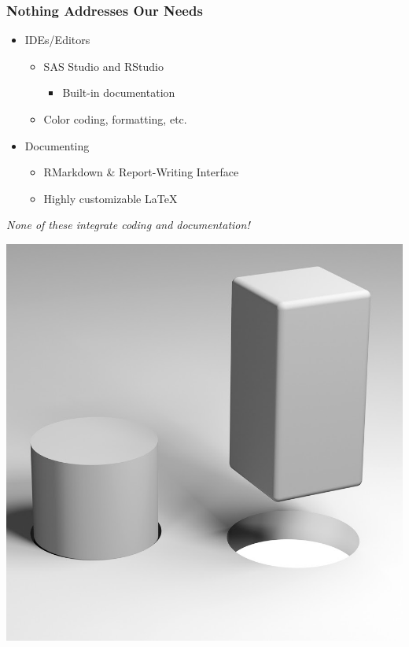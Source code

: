 \documentclass[xcolor={dvipsnames}]{beamer}
\newcommand{\ft}{\frametitle}
\newcommand{\bi}{\begin{itemize}}
\newcommand{\ei}{\end{itemize}}
\begin{document}
\begin{frame}
\ft{Nothing Addresses Our Needs}
\begin{minipage}{.45\textwidth}
\bi
	\item IDEs/Editors
		\bi
			\item SAS Studio and RStudio
				\bi
					\item Built-in documentation
				\ei
			\item Color coding, formatting, etc.
		\ei
	\item Documenting
		\bi
			\item RMarkdown \& Report-Writing Interface
			\item Highly customizable LaTeX
		\ei
\ei
\begin{center}
	\emph{None of these integrate coding and documentation!}
\end{center}
\end{minipage}
\begin{minipage}{.45\textwidth}
\begin{center}
	\includegraphics[width = \textwidth]{squarepegroundhole.jpg}
\end{center}
\end{minipage}

\end{frame}
\end{document}
